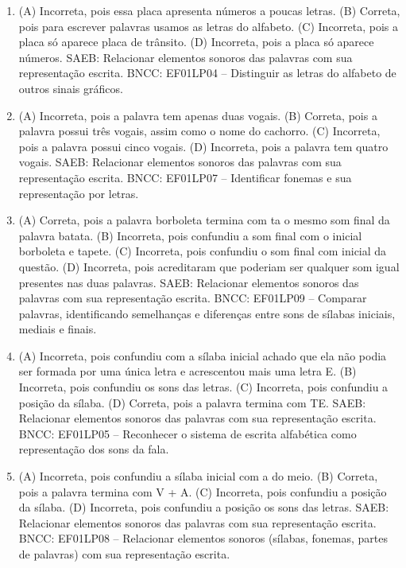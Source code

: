 \begin{enumerate}
\item
(A) Incorreta, pois essa placa apresenta números a poucas letras.
(B) Correta, pois para escrever palavras usamos as letras do alfabeto.
(C) Incorreta, pois a placa só aparece placa de trânsito.
(D) Incorreta, pois a placa só aparece números.
SAEB: Relacionar elementos sonoros das palavras com sua
representação escrita.
BNCC: EF01LP04 -- Distinguir as letras do alfabeto de outros sinais
gráficos.

\item
(A) Incorreta, pois a palavra tem apenas duas vogais.
(B) Correta, pois a palavra possui três vogais, assim como o nome do
cachorro.
(C) Incorreta, pois a palavra possui cinco vogais.
(D) Incorreta, pois a palavra tem quatro vogais.
SAEB: Relacionar elementos sonoros das palavras com sua
representação escrita.
BNCC: EF01LP07 -- Identificar fonemas e sua representação por
letras.

\item
(A) Correta, pois a palavra borboleta termina com ta o mesmo som final
da palavra batata.
(B) Incorreta, pois confundiu a som final com o inicial borboleta e
tapete.
(C) Incorreta, pois confundiu o som final com inicial da questão.
(D) Incorreta, pois acreditaram que poderiam ser qualquer som igual
presentes nas duas palavras.
SAEB: Relacionar elementos sonoros das palavras com sua
representação escrita.
BNCC: EF01LP09 -- Comparar palavras, identificando semelhanças e
diferenças entre sons de sílabas iniciais, mediais e finais.

\item
(A) Incorreta, pois confundiu com a sílaba inicial achado que ela não
podia ser formada por uma única letra e acrescentou mais uma letra E.
(B) Incorreta, pois confundiu os sons das letras.
(C) Incorreta, pois confundiu a posição da sílaba.
(D) Correta, pois a palavra termina com TE.
SAEB: Relacionar elementos sonoros das palavras com sua
representação escrita.
BNCC: EF01LP05 -- Reconhecer o sistema de escrita alfabética
como representação dos sons da fala.

\item
(A) Incorreta, pois confundiu a sílaba inicial com a do meio.
(B) Correta, pois a palavra termina com V + A.
(C) Incorreta, pois confundiu a posição da sílaba.
(D) Incorreta, pois confundiu a posição os sons das letras.
SAEB: Relacionar elementos sonoros das palavras com sua representação escrita.
BNCC: EF01LP08 -- Relacionar elementos sonoros (sílabas, fonemas, partes de
palavras) com sua representação escrita.


\end{enumerate}
